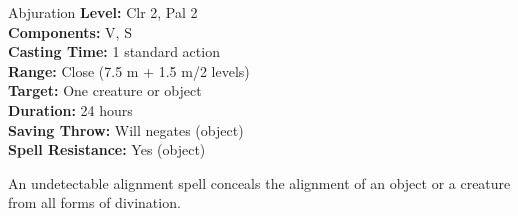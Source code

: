 {Abjuration}
{
	\textbf{Level:}
	Clr 2, Pal 2\\
	\textbf{Components:}
	V, S\\
	\textbf{Casting Time:}
	1 standard action\\
	\textbf{Range:}
	Close (7.5 m + 1.5 m/2 levels)\\
	\textbf{Target:}
	One creature or object\\
	\textbf{Duration:}
	24 hours\\
	\textbf{Saving Throw:}
	Will negates (object)\\
	\textbf{Spell Resistance:}
	Yes (object)\\
}
{
	An undetectable alignment spell conceals the alignment of an object or a creature from all forms of divination.

}
